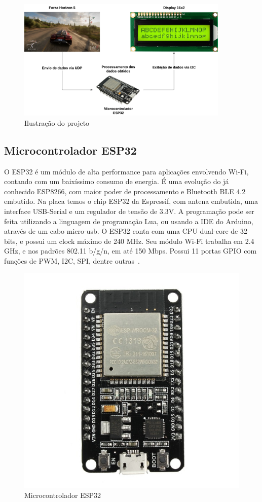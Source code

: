 \documentclass[12pt]{article}
\begin{document}
\begin{figure}[ht]
  \centering
  \includegraphics[width=0.9\textwidth]{images/illustration.png}
  \caption{Ilustração do projeto}
  \label{fig:illustration}
\end{figure}

\subsection{Microcontrolador ESP32}

O ESP32 é um módulo de alta performance para aplicações envolvendo Wi-Fi, contando com um baixíssimo consumo de energia.
É uma evolução do já conhecido ESP8266, com maior poder de processamento e Bluetooth BLE 4.2 embutido.
Na placa temos o chip ESP32 da Espressif, com antena embutida, uma interface USB-Serial e um regulador de tensão de 3.3V.
A programação pode ser feita utilizando a linguagem de programação Lua, ou usando a IDE do Arduino, através de um cabo micro-usb.
O ESP32 conta com uma CPU dual-core de 32 bits, e possui um clock máximo de 240 MHz. Seu módulo Wi-Fi trabalha em 2.4 GHz,
e nos padrões 802.11 b/g/n, em até 150 Mbps. Possui 11 portas GPIO com funções de PWM, I2C, SPI, dentre outras~\cite{esp32}.

\begin{figure}[ht]
  \centering
  \includegraphics[width=.3\textwidth]{images/esp32.jpg}
  \caption{Microcontrolador ESP32}
  \label{fig:esp32}
\end{figure}
\end{document}
